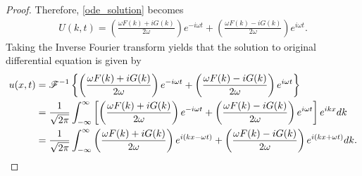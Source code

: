 \begin{proof}
  Therefore, \eqref{ode_solution} becomes
  \begin{align*}
    U(k, t) = \left(\frac{\omega F(k) + i G(k)}{2\omega}\right)e^{-i\omega t} + \left(\frac{\omega F(k) - i G(k)}{2\omega}\right)e^{i\omega t}.
  \end{align*}
  Taking the Inverse Fourier transform yields that the solution to original differential equation is given by
  \begin{align*}
    u(x, t) &= \mathscr{F}^{-1}\left\{ {\left(\frac{\omega F(k) + i G(k)}{2\omega}\right)e^{-i\omega t} + \left(\frac{\omega F(k) - i G(k)}{2\omega}\right)e^{i\omega t}} \right\} \\
    &= \frac{1}{\sqrt{2\pi}}\int_{-\infty}^\infty \left[\left(\frac{\omega F(k) + i G(k)}{2\omega}\right)e^{-i\omega t} + \left(\frac{\omega F(k) - i G(k)}{2\omega}\right)e^{i\omega t}\right] e^{ikx} dk \\
    &= \frac{1}{\sqrt{2\pi}}\int_{-\infty}^\infty \left(\frac{\omega F(k) + i G(k)}{2\omega}\right)e^{i(kx-\omega t)} + \left(\frac{\omega F(k) - i G(k)}{2\omega}\right)e^{i(kx + \omega t)}dk.
  \end{align*}

\end{proof}
\newpage
